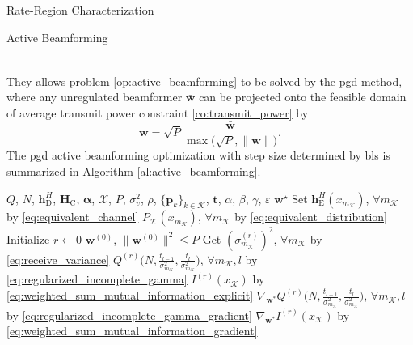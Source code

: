 \documentclass[journal]{IEEEtran}
\begin{document}
\begin{section}{Rate-Region Characterization}
\begin{subsection}{Active Beamforming}
\begin{figure*}[!b]
\begin{align}
				\label{eq:weighted_sum_mutual_information_gradient}
			\end{align}
		\end{figure*}
		They allows problem \eqref{op:active_beamforming} to be solved by the \gls{pgd} method, where any unregulated beamformer $\bar{\boldsymbol{w}}$ can be projected onto the feasible domain of average transmit power constraint \eqref{co:transmit_power} by
		\begin{equation}
			\boldsymbol{w} = \sqrt{P} \frac{\bar{\boldsymbol{w}}}{\max\bigl(\sqrt{P},\lVert\bar{\boldsymbol{w}}\rVert\bigr)}.
			\label{eq:beamforming_projection}
		\end{equation}
		The \gls{pgd} active beamforming optimization with step size determined by \gls{bls} is summarized in Algorithm \ref{al:active_beamforming}.
		\begin{algorithm}[!t]
			\caption{Iterative Active Beamforming Optimization by \gls{pgd} with \gls{bls}}
			\label{al:active_beamforming}
			\begin{algorithmic}[1]
				\Require $Q$, $N$, $\boldsymbol{h}_{\mathrm{D}}^H$, $\boldsymbol{H}_{\mathrm{C}}$, $\boldsymbol{\alpha}$, $\mathcal{X}$, $P$, $\sigma_v^2$, $\rho$, $\{\boldsymbol{p}_k\}_{k \in \mathcal{K}}$, $\boldsymbol{t}$, $\alpha$, $\beta$, $\gamma$, $\varepsilon$
				\Ensure $\boldsymbol{w}^\star$
				\State Set $\boldsymbol{h}_{\mathrm{E}}^H(x_{m_{\mathcal{K}}})$, $\forall m_{\mathcal{K}}$ by \eqref{eq:equivalent_channel}
				\State \phantom{Set} $P_{\mathcal{K}}(x_{m_{\mathcal{K}}})$, $\forall m_{\mathcal{K}}$ by \eqref{eq:equivalent_distribution}
				\State Initialize $r \gets 0$
				\State \phantom{Initialize} $\boldsymbol{w}^{(0)}$, $\lVert\boldsymbol{w}^{(0)}\rVert^2 \le P$
				\State Get $(\sigma_{m_{\mathcal{K}}}^{(r)})^2$, $\forall m_{\mathcal{K}}$ by \eqref{eq:receive_variance} \label{st:gradient_descent_begin}
				\State \phantom{Get} $Q^{(r)}\bigl(N,\frac{t_{l-1}}{\sigma_{m_{\mathcal{K}}}^2},\frac{t_l}{\sigma_{m_{\mathcal{K}}}^2}\bigr)$, $\forall m_{\mathcal{K}},l$ by \eqref{eq:regularized_incomplete_gamma}
				\State \phantom{Get} $I^{(r)}(x_{\mathcal{K}})$ by \eqref{eq:weighted_sum_mutual_information_explicit} \label{st:gradient_descent_end}
				\State \phantom{Get} $\nabla_{\boldsymbol{w}^*} Q^{(r)}\bigl(N,\frac{t_{l-1}}{\sigma_{m_{\mathcal{K}}}^2},\frac{t_l}{\sigma_{m_{\mathcal{K}}}^2}\bigr)$, $\forall m_{\mathcal{K}},l$ by \eqref{eq:regularized_incomplete_gamma_gradient} \label{st:gradient_update_start}
				\State \phantom{Get} $\nabla_{\boldsymbol{w}^*} I^{(r)}(x_{\mathcal{K}})$ by \eqref{eq:weighted_sum_mutual_information_gradient} \label{st:gradient_update_end}

\end{algorithmic}
\end{algorithm}
\end{subsection}
\end{section}
\end{document}
